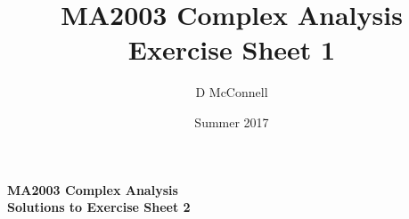 \documentclass[oneside, 11pt]{article}
\title{MA2003 Complex Analysis Exercise Sheet 1}
\author{D McConnell}
\date{Summer 2017}
\begin{document}
\thispagestyle{empty}
\begin{center}
{
\large\bf
MA2003 Complex Analysis \\
Solutions to Exercise Sheet 2 \\
}
\end{center}
\smallskip

\end{document}
